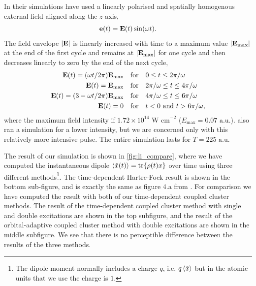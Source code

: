 In their simulations \citeauthor{li2005time} have used a linearly polarised and 
spatially homogenous external field aligned along the $z$-axis, 
\begin{equation}
    \vb{e}(t) = \vb{E}(t)\sin(\omega t).
\end{equation}
The field envelope $|\vb{E}|$ is linearly increased with time to a maximum value 
$|\vb{E}_\text{max}|$ at the end of the first cycle and remains at $|\vb{E}_\text{max}|$
for one cycle and then decreases linearly to zero by the end of the next cycle,
\begin{equation}
    \label{eq:li_laser}
    \begin{aligned}
        \vb{E}(t) = (\omega t / 2\pi) \vb{E}_\text{max} \quad &\text{for} \quad
            0 \leq t \leq 2\pi / \omega \\ 
        \vb{E}(t) = \vb{E}_\text{max} \quad &\text{for} \quad 
            2\pi / \omega \leq t \leq 4\pi / \omega \\ 
        \vb{E}(t) = (3 - \omega t / 2\pi) \vb{E}_\text{max} \quad &\text{for} \quad 
            4\pi / \omega \leq t \leq 6\pi / \omega \\
        \vb{E}(t) = 0 \quad &\text{for} \quad
            t < 0 \text{ and } t > 6\pi / \omega,
    \end{aligned}
\end{equation}
where the maximum field intensity if $1.72\times10^{14} \text{ W cm}^{-2}$ 
($E_\text{max} = 0.07 \text{ a.u.}$). \citeauthor{li2005time} also ran a simulation 
for a lower intensity, but we are concerned only with this relatively more intensive 
pulse. The entire simulation lasts for $T=225 \text{ a.u.}$

The result of our simulation is shown in \autoref{fig:li_compare}, where we have 
computed the instantaneous dipole $\ev{\hat{x}(t)} = \tr{\rho(t)x}$ over time using
three different methods\footnote{The dipole moment normally includes a charge $q$, i.e,
$q\ev{\hat{x}}$ but in 
the atomic units that we use the charge is $1$.}. The 
time-dependent Hartre-Fock result is shown in the bottom sub-figure, and
is exactly the same as figure 4.a from \citeauthor{li2005time} \cite{li2005time}.
For comparison we have computed the result with both of 
our time-dependent coupled cluster methods. The result of the time-dependent 
coupled cluster method with single and double excitations are shown in the top subfigure,
and the result of the orbital-adaptive coupled cluster method with double excitations 
are shown in the middle subfigure. We see that there is no perceptible difference between 
the results of the three methods.

